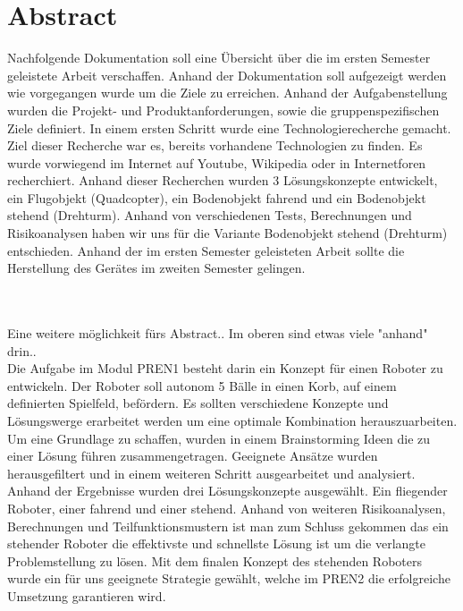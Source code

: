 \section{Abstract}
Nachfolgende Dokumentation soll eine Übersicht über die im ersten Semester geleistete Arbeit verschaffen. Anhand der Dokumentation soll aufgezeigt werden wie vorgegangen wurde um die Ziele zu erreichen. Anhand der Aufgabenstellung wurden die Projekt- und Produktanforderungen, sowie die gruppenspezifischen Ziele definiert. In einem ersten Schritt wurde eine Technologierecherche gemacht. Ziel dieser Recherche war es, bereits vorhandene Technologien zu finden. Es wurde vorwiegend im Internet auf Youtube, Wikipedia oder in Internetforen recherchiert. Anhand dieser Recherchen wurden 3 Lösungskonzepte entwickelt, ein Flugobjekt (Quadcopter), ein Bodenobjekt fahrend und ein Bodenobjekt stehend (Drehturm). Anhand von verschiedenen Tests, Berechnungen und Risikoanalysen haben wir uns für die Variante Bodenobjekt stehend (Drehturm) entschieden. Anhand der im ersten Semester geleisteten Arbeit sollte die Herstellung des Gerätes im zweiten Semester gelingen.

\\
\\
Eine weitere möglichkeit fürs Abstract.. Im oberen sind etwas viele "anhand" drin..
\\
Die Aufgabe im Modul PREN1 besteht darin ein Konzept für einen Roboter zu entwickeln. Der Roboter soll autonom 5 Bälle in einen Korb, auf einem definierten Spielfeld, befördern. Es sollten verschiedene Konzepte und Lösungswerge erarbeitet werden um eine optimale Kombination herauszuarbeiten. Um eine Grundlage zu schaffen, wurden in einem Brainstorming Ideen die zu einer Lösung führen zusammengetragen. Geeignete Ansätze wurden herausgefiltert und in einem weiteren Schritt ausgearbeitet und analysiert. Anhand der Ergebnisse wurden drei Lösungskonzepte ausgewählt. Ein fliegender Roboter, einer fahrend und einer stehend. Anhand von weiteren Risikoanalysen, Berechnungen und Teilfunktionsmustern ist man zum Schluss gekommen das ein stehender Roboter die effektivste und schnellste Lösung ist um die verlangte Problemstellung zu lösen. Mit dem finalen Konzept des stehenden Roboters wurde ein für uns geeignete Strategie gewählt, welche im PREN2 die erfolgreiche Umsetzung garantieren wird.